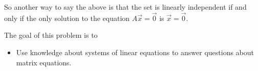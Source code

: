 \documentclass{workbook}
\newcommand{\bookonlynewpage}{\begin{bookonly}\newpage\end{bookonly}}
\begin{document}
\begin{slide}
\begin{parts}
\begin{solution}
				So another way to say the above is that the set is linearly independent
				if and only if the only solution to the equation $A \vec x = \vec 0$
				is $\vec x = \vec 0$.
			\end{solution}
	\end{parts}

\end{slide}
\begin{slide}


	\bookonlynewpage
	\question
	\begin{annotation}
		\begin{goals}

			The goal of this problem is to
			\begin{itemize}
				\item Use knowledge about systems of linear equations to answer questions
					about matrix equations.
			\end{itemize}
		\end{goals}


\end{annotation}
\end{slide}
\end{document}
